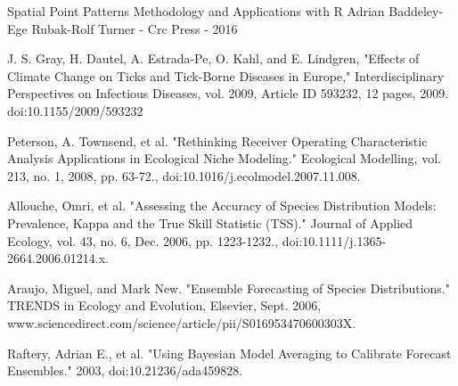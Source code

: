 \noindent [10]  Spatial Point Patterns Methodology and Applications with R
Adrian Baddeley-Ege Rubak-Rolf Turner - Crc Press - 2016 \newline

\noindent [11] J. S. Gray, H. Dautel, A. Estrada-Pe, O. Kahl, and E. Lindgren, 
"Effects of Climate Change on Ticks and Tick-Borne Diseases in Europe,"
Interdisciplinary Perspectives on Infectious Diseases, vol. 2009, Article ID 593232,
12 pages, 2009. doi:10.1155/2009/593232\newline


\noindent [12] Peterson, A. Townsend, et al.
"Rethinking Receiver Operating Characteristic Analysis Applications in Ecological Niche Modeling."\newline
Ecological Modelling, vol. 213, no. 1, 2008, pp. 63-72., doi:10.1016/j.ecolmodel.2007.11.008. \newline

\noindent[13] Allouche, Omri, et al. 
"Assessing the Accuracy of Species Distribution Models: Prevalence, Kappa and the True Skill Statistic (TSS)." 
Journal of Applied Ecology, vol. 43, no. 6, Dec. 2006, pp. 1223-1232., 
doi:10.1111/j.1365-2664.2006.01214.x. \newline

\noindent [14] Araujo, Miguel, and Mark New. "Ensemble Forecasting of Species Distributions." \newline TRENDS in Ecology and Evolution, Elsevier,  Sept. 2006, www.sciencedirect.com/science/article/pii/S016953470600303X. \newline

 
 \noindent [15] Raftery, Adrian E., et al. 
"Using Bayesian Model Averaging to Calibrate Forecast Ensembles." 2003,\newline
 doi:10.21236/ada459828.
 
 
 
 